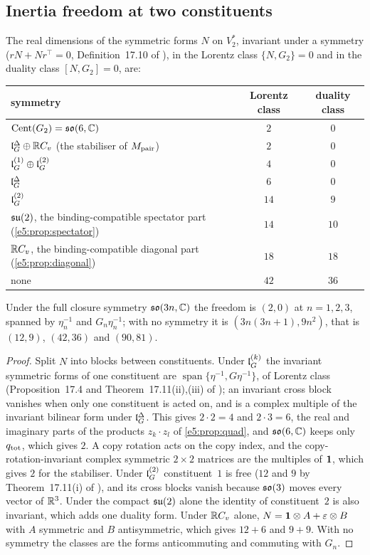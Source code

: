 \subsection{Inertia freedom at two constituents}
\label{e5:sec:inertia}

\begin{theorem}
\label{e5:thm:inertia}
The real dimensions of the symmetric forms $N$ on $V_2^*$, invariant under a symmetry ($rN+Nr^{\!\top}=0$, Definition~17.10 of \cite{ES17}), in the
Lorentz class $\{N,G_2\}=0$ and in the duality class $[N,G_2]=0$, are:
\begin{center}
\small
\begin{tabular}{@{}lcc@{}}
\toprule
symmetry & Lorentz class & duality class\\
\midrule
$\operatorname{Cent}(G_2)=\mathfrak{so}(6,\mathbb{C})$ & $2$ & $0$\\
$\mathfrak l_G^\Delta\oplus\mathbb{R} C_v$ (the stabiliser of $M_{\rm pair}$) & $2$ & $0$\\
$\mathfrak l_G^{(1)}\oplus\mathfrak l_G^{(2)}$ & $4$ & $0$\\
$\mathfrak l_G^\Delta$ & $6$ & $0$\\
$\mathfrak l_G^{(2)}$ & $14$ & $9$\\
$\mathfrak{su}(2)$, the binding-compatible spectator part (\cref{e5:prop:spectator}) & $14$ & $10$\\
$\mathbb{R} C_v$, the binding-compatible diagonal part (\cref{e5:prop:diagonal}) & $18$ & $18$\\
none & $42$ & $36$\\
\bottomrule
\end{tabular}
\end{center}
Under the full closure symmetry $\mathfrak{so}(3n,\mathbb{C})$ the freedom is $(2,0)$ at $n=1,2,3$, spanned by $\eta_n^{-1}$ and $G_n\eta_n^{-1}$; with no symmetry it is
$(3n(3n+1),9n^2)$, that is $(12,9)$, $(42,36)$ and $(90,81)$.
\end{theorem}

\begin{proof}
Split $N$ into blocks between constituents. Under $\mathfrak l_G^{(k)}$ the invariant symmetric forms of one constituent are $\operatorname{span}\{\eta^{-1},G\eta^{-1}\}$,
of Lorentz class (Proposition~17.4 and Theorem~17.11(ii),(iii) of \cite{ES17}); an invariant cross block vanishes when only one constituent is acted on, and
is a complex multiple of the invariant bilinear form under $\mathfrak l_G^\Delta$. This gives $2\cdot2=4$ and $2\cdot3=6$, the real and imaginary parts of the
products $z_k\cdot z_l$ of \cref{e5:prop:quad}, and $\mathfrak{so}(6,\mathbb{C})$ keeps only $q_{\rm tot}$, which gives $2$. A copy rotation acts on the copy index, and the
copy-rotation-invariant complex symmetric $2\times2$ matrices are the multiples of $\mathbf 1$, which gives $2$ for the stabiliser. Under $\mathfrak l_G^{(2)}$ constituent~$1$ is
free ($12$ and $9$ by Theorem~17.11(i) of \cite{ES17}), and its cross blocks vanish because $\mathfrak{so}(3)$ moves every vector of $\mathbb{R}^3$. Under the compact $\mathfrak{su}(2)$
alone the identity of constituent~$2$ is also invariant, which adds one duality form. Under $\mathbb{R} C_v$ alone, $N=\mathbf 1\otimes A+\varepsilon\otimes B$ with $A$
symmetric and $B$ antisymmetric, which gives $12+6$ and $9+9$. With no symmetry the classes are the forms anticommuting and commuting with $G_n$.
\end{proof}

